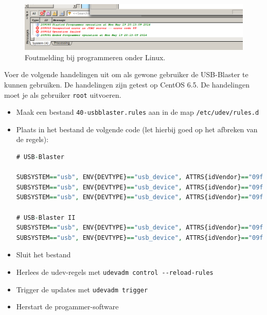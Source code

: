 \documentclass[a4paper,12pt,fleqn,twoside]{book}
\def\tutpicscale{0.455}
\begin{document}
\begin{figure}[H]
\centering
\includegraphics[scale=\tutpicscale]{231Aquartus_errorCode_89}
\caption{Foutmelding bij programmeren onder Linux.}
\label{fig:230jtagerror89}
\end{figure}

Voer de volgende handelingen uit om als gewone gebruiker de USB-Blaster te
kunnen gebruiken. De handelingen zijn getest op CentOS 6.5. De handelingen
moet je als gebruiker \lstinline|root| uitvoeren.

\begin{itemize}\itemsep-1pt
\item Maak een bestand \lstinline|40-usbblaster.rules| aan in de map
      \lstinline|/etc/udev/rules.d|
\item Plaats in het bestand de volgende code (let hierbij goed op het afbreken
      van de regels):
\begin{lstlisting}[language=VHDL,numbers=none,belowskip=-3.5ex]
# USB-Blaster

SUBSYSTEM=="usb", ENV{DEVTYPE}=="usb_device", ATTRS{idVendor}=="09fb", ATTRS{idProduct}=="6001", MODE="0666", SYMLINK+="usbblaster/%k"
SUBSYSTEM=="usb", ENV{DEVTYPE}=="usb_device", ATTRS{idVendor}=="09fb", ATTRS{idProduct}=="6002", MODE="0666", SYMLINK+="usbblaster/%k"
SUBSYSTEM=="usb", ENV{DEVTYPE}=="usb_device", ATTRS{idVendor}=="09fb", ATTRS{idProduct}=="6003", MODE="0666", SYMLINK+="usbblaster/%k"

# USB-Blaster II
SUBSYSTEM=="usb", ENV{DEVTYPE}=="usb_device", ATTRS{idVendor}=="09fb", ATTRS{idProduct}=="6010", MODE="0666", SYMLINK+="usbblaster2/%k"
SUBSYSTEM=="usb", ENV{DEVTYPE}=="usb_device", ATTRS{idVendor}=="09fb", ATTRS{idProduct}=="6810", MODE="0666", SYMLINK+="usbblaster2/%k"
\end{lstlisting}
\item Sluit het bestand
\item Herlees de udev-regels met \lstinline|udevadm control --reload-rules|
\item Trigger de updates met \lstinline|udevadm trigger|
\item Herstart de progammer-software
\end{itemize}
\end{document}
